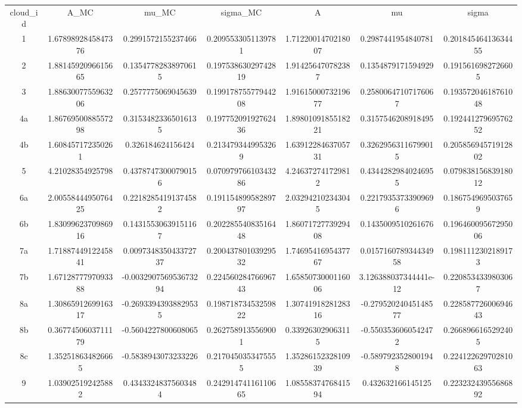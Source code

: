 \begin{table}
\begin{tabular}{ccccccc}
cloud_id & A_MC & mu_MC & sigma_MC & A & mu & sigma \\
1 & 1.6789892845847376 & 0.2991572155237466 & 0.2095533051139781 & 1.7122001470218007 & 0.2987441954840781 & 0.20184546413634455 \\
2 & 1.8814592096615665 & 0.13547782838970615 & 0.19753863029742819 & 1.914256470782387 & 0.1354879171594929 & 0.1915616982726605 \\
3 & 1.8863007755963206 & 0.2577775069045639 & 0.19917875577944208 & 1.9161500073219677 & 0.25800647107176067 & 0.19357204618761048 \\
4a & 1.8676950088557298 & 0.31534823365016135 & 0.19775209192762436 & 1.8980109185518221 & 0.3157546208918495 & 0.19244127969576252 \\
4b & 1.608457172350261 & 0.326184624156424 & 0.2134793449953269 & 1.6391228463705731 & 0.32629563116799015 & 0.20585694571912802 \\
5 & 4.21028354925798 & 0.43787473000790156 & 0.07097976610343286 & 4.246372741729812 & 0.43442829840246955 & 0.07983815683918012 \\
6a & 2.0055844495076425 & 0.22182854191374582 & 0.19115489958289797 & 2.032942102343045 & 0.22179353733909696 & 0.1867549695037659 \\
6b & 1.8309962370986916 & 0.14315530639151167 & 0.20228554083516448 & 1.8607172773929408 & 0.1435009510261676 & 0.19646009567295006 \\
7a & 1.7188744912245841 & 0.009734835043372737 & 0.20043780103929532 & 1.7469541695437767 & 0.015716078934434958 & 0.1981112302189173 \\
7b & 1.6712877797093388 & -0.003290756953673294 & 0.22456028476696743 & 1.6585073000116006 & 3.126388037344441e-12 & 0.2208534339803067 \\
8a & 1.3086591269916317 & -0.26933943938829535 & 0.19871873453259822 & 1.3074191828128316 & -0.27952024045148577 & 0.22858772600694643 \\
8b & 0.3677450603711179 & -0.5604227800608065 & 0.2627589135569001 & 0.339263029063115 & -0.5503536060542472 & 0.2668966165292405 \\
8c & 1.352518634826665 & -0.5838943073233226 & 0.2170450353475555 & 1.3528615232810939 & -0.5897923528001948 & 0.22412262970281063 \\
9 & 1.039025192425882 & 0.43433248375603484 & 0.24291474116110665 & 1.0855837476841594 & 0.432632166145125 & 0.22323243955686892 \\

\end{tabular}
\end{table}
